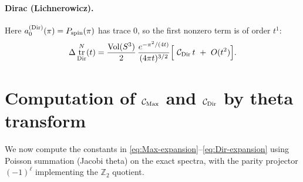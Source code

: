 \documentclass[11pt]{article}
\theoremstyle{definition}
\theoremstyle{remark}
\DeclareMathOperator{\tr}{tr}
\DeclareMathOperator{\Vol}{Vol}
\begin{document}
\paragraph{Dirac (Lichnerowicz).}
Here $a_0^{\rm(Dir)}(\pi)=P_{\rm spin}(\pi)$ has trace $0$, so the first nonzero term is of order $t^1$:
\begin{equation}\label{eq:Dir-expansion}
\Delta \tr^{N}_{\rm Dir}(t)
=\frac{\Vol(S^3)}{2}\,\frac{e^{-\pi^2/(4t)}}{(4\pi t)^{3/2}}\Big[\ \mathcal{C}_{\rm Dir}\,t\ +\ O(t^2)\Big].
\end{equation}

\section{Computation of $\mathcal{C}_{\rm Max}$ and $\mathcal{C}_{\rm Dir}$ by theta transform}
We now compute the constants in \eqref{eq:Max-expansion}--\eqref{eq:Dir-expansion} using Poisson summation (Jacobi theta) on the exact spectra, with the parity projector $(-1)^\ell$ implementing the $\mathbb{Z}_2$ quotient.
\end{document}
